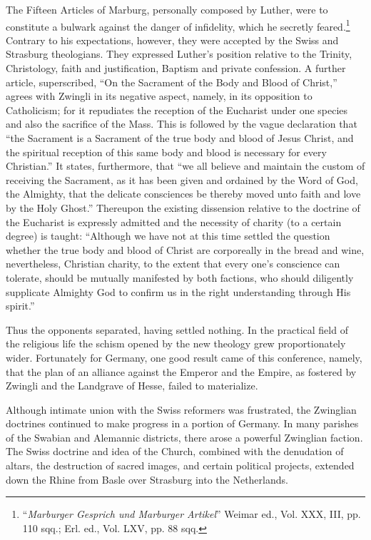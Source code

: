 The Fifteen Articles of Marburg, personally composed by Luther, were to
constitute a bulwark against the danger of infidelity, which he secretly
feared.\footnote{“\textit{Marburger Gesprich und Marburger Artikel}” Weimar ed., Vol. XXX, III, pp. 110
sqq.; Erl. ed., Vol. LXV, pp. 88 sqq.}
Contrary to his expectations, however, they were accepted by the
Swiss and Strasburg theologians. They expressed Luther’s position relative
to the Trinity, Christology, faith and justification, Baptism and private confession.
A further article, superscribed, “On the Sacrament of the Body and
Blood of Christ,” agrees with Zwingli in its negative aspect, namely, in its
opposition to Catholicism; for it repudiates the reception of the Eucharist
under one species and also the sacrifice of the Mass. This is followed by the
vague declaration that “the Sacrament is a Sacrament of the true body and
blood of Jesus Christ, and the spiritual reception of this same body and blood
is necessary for every Christian.” It states, furthermore, that “we all believe
and maintain the custom of receiving the Sacrament, as it has been given and
ordained by the Word of God, the Almighty, that the delicate consciences
be thereby moved unto faith and love by the Holy Ghost.” Thereupon the
existing dissension relative to the doctrine of the Eucharist is expressly
admitted and the necessity of charity (to a certain degree) is taught:
“Although we have not at this time settled the question whether the true body
and blood of Christ are corporeally in the bread and wine, nevertheless,
Christian charity, to the extent that every one’s conscience can tolerate,
should be mutually manifested by both factions, who should diligently
supplicate Almighty God to confirm us in the right understanding through His
spirit.”

Thus the opponents separated, having settled nothing. In the practical
field of the religious life the schism opened by the new theology
grew proportionately wider. Fortunately for Germany, one good
result came of this conference, namely, that the plan of an alliance
against the Emperor and the Empire, as fostered by Zwingli and the
Landgrave of Hesse, failed to materialize.

Although intimate union with the Swiss reformers was frustrated,
the Zwinglian doctrines continued to make progress in a portion
of Germany. In many parishes of the Swabian and Alemannic districts,
there arose a powerful Zwinglian faction. The Swiss doctrine and idea
of the Church, combined with the denudation of altars, the destruction
of sacred images, and certain political projects,
extended down the Rhine from Basle over Strasburg into the Netherlands.

